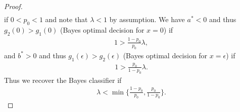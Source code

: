 \begin{proof}
\begin{align*}
	\end{align*}
	if $0<p_0<1$ and note that $\lambda<1$ by assumption. We have $a^*<0$ and thus $g_2(0)>g_1(0)$ (Bayes optimal decision for $x=0$) if 
	\begin{align*}
    	1 > \frac{1-p_0}{p_0}\lambda,
	\end{align*}
   	and $b^*>0$ and thus $g_1(\epsilon)>g_2(\epsilon)$ (Bayes optimal decision for $x=\epsilon$) if
   	\begin{align*}
	    1 > \frac{p_0}{1-p_0}\lambda.
   	\end{align*}
    Thus we recover the Bayes classifier if
    \begin{align*}
    	\lambda < \min\Big\{\frac{1-p_0}{p_0},\frac{p_0}{1-p_0}\Big\}.
   	\end{align*}
\end{proof}